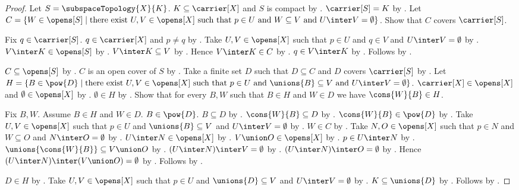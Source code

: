 \begin{proof}
    Let $S=\subspaceTopology{X}{K}$.
    $K\subseteq\carrier[X]$ and $S$ is compact by .
    $\carrier[S]=K$ by .
    Let $C=\{W\in\opens[S]\mid\text{there exist $U,V\in\opens[X]$ such that
        $p\in U$ and $W\subseteq V$ and $U\inter V=\emptyset$}\}$.
    Show that $C$ covers $\carrier[S]$.
    \begin{subproof}
        Fix $q\in\carrier[S]$.
        $q\in\carrier[X]$ and $p\neq q$ by .
        Take $U,V\in\opens[X]$ such that $p\in U$ and $q\in V$ and
            $U\inter V=\emptyset$ by .
        $V\inter K\in\opens[S]$ by .
        $V\inter K\subseteq V$ by .
        Hence $V\inter K\in C$ by \auto.
        $q\in V\inter K$ by .
        Follows by \auto.
    \end{subproof}
    $C\subseteq\opens[S]$ by .
    $C$ is an open cover of $S$ by .
    Take a finite set $D$ such that $D\subseteq C$ and
        $D$ covers $\carrier[S]$ by .
    Let $H=\{B\in\pow{D}\mid\text{there exist $U,V\in\opens[X]$ such that
        $p\in U$ and $\unions{B}\subseteq V$ and $U\inter V=\emptyset$}\}$.
    $\carrier[X]\in\opens[X]$ and $\emptyset\in\opens[X]$ by
        .
    $\emptyset\in H$ by .
    Show that for every $B,W$ such that $B\in H$ and $W\in D$ we have
        $\cons{W}{B}\in H$.
    \begin{subproof}
        Fix $B,W$.
        Assume $B\in H$ and $W\in D$.
        $B\in\pow{D}$.
        $B\subseteq D$ by .
        $\cons{W}{B}\subseteq D$ by .
        $\cons{W}{B}\in\pow{D}$ by .
        Take $U,V\in\opens[X]$ such that $p\in U$ and
            $\unions{B}\subseteq V$ and $U\inter V=\emptyset$ by \auto.
        $W\in C$ by .
        Take $N,O\in\opens[X]$ such that $p\in N$ and
            $W\subseteq O$ and $N\inter O=\emptyset$ by \auto.
        $U\inter N\in\opens[X]$ by .
        $V\union O\in\opens[X]$ by .
        $p\in U\inter N$ by .
        $\unions{\cons{W}{B}}\subseteq V\union O$ by
            .
        $(U\inter N)\inter V=\emptyset$ by
            .
        $(U\inter N)\inter O=\emptyset$ by
            .
        Hence $(U\inter N)\inter(V\union O)=\emptyset$
            by .
        Follows by \auto.
    \end{subproof}
    $D\in H$ by .
    Take $U,V\in\opens[X]$ such that $p\in U$ and
        $\unions{D}\subseteq V$ and $U\inter V=\emptyset$ by \auto.
    $K\subseteq\unions{D}$ by .
    Follows by .
\end{proof}

